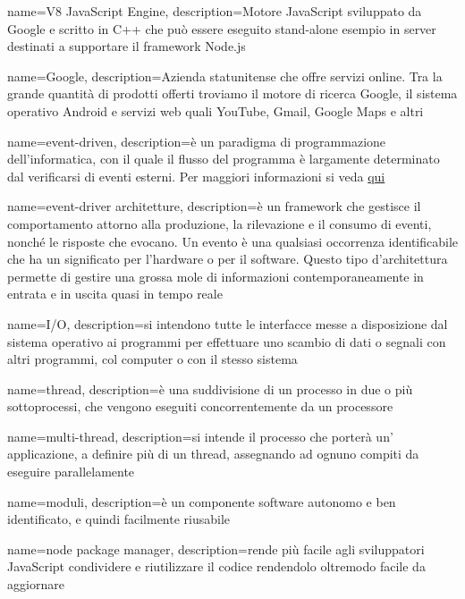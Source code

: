  {
	name=V8 JavaScript Engine,
	description={Motore JavaScript  sviluppato da Google e scritto in C++ che  può essere eseguito stand-alone esempio in server destinati a supportare il framework Node.js}
}

 {
	name=Google,
	description={Azienda statunitense che offre servizi online. Tra la grande quantità di prodotti offerti troviamo il motore di ricerca Google, il sistema operativo Android e servizi web quali YouTube, Gmail, Google Maps e altri}
}

 {
	name=event-driven,
	description={è un paradigma di programmazione dell'informatica, con il quale il flusso del programma è largamente determinato dal verificarsi di eventi esterni. Per maggiori informazioni si veda \href{https://it.wikipedia.org/wiki/Programmazione_a_eventi}{qui}}
}

 {
	name=event-driver architetture,
	description={è un framework che gestisce il comportamento attorno alla produzione, la rilevazione e il consumo di eventi, nonché le risposte che evocano. Un evento è una qualsiasi occorrenza identificabile che ha un significato per l'hardware o per il software. Questo tipo d'architettura  permette di gestire  una grossa mole di informazioni contemporaneamente  in entrata e in uscita quasi in tempo reale}
}

 {
	name=I/O,
	description={si intendono tutte le interfacce messe a disposizione dal sistema operativo ai programmi per effettuare uno scambio di dati o segnali con altri programmi, col computer o con il stesso sistema}
}

 {
	name=thread,
	description={è una suddivisione di un processo in due o più sottoprocessi, che vengono eseguiti concorrentemente da un processore}
}

 {
	name=multi-thread,
	description={si intende il processo che porterà un' applicazione, a definire più di un thread, assegnando ad ognuno compiti da eseguire parallelamente}
}

 {
	name=moduli,
	description={è un componente software autonomo e ben identificato, e quindi facilmente riusabile}
}

 {
	name=node package manager,
	description={rende più facile agli sviluppatori JavaScript condividere e riutilizzare il codice rendendolo oltremodo facile da aggiornare}
}


